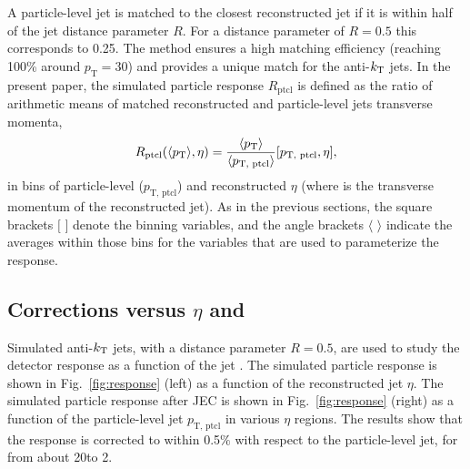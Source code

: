 \documentclass[11pt,twoside,a4paper,cmspaper,final,collab]{cms-tdr}
\begin{document}
A particle-level jet is matched to the closest reconstructed jet if it is within half of the jet distance parameter $R$. For a distance parameter of $R=0.5$ this corresponds to 0.25. The method ensures a high matching efficiency (reaching 100\% around $p_\mathrm{T}=30$\GeV) and provides a unique match for the anti-$k_{\mathrm{T}}$ jets.
In the present paper, the simulated particle response $R_\mathrm{ptcl}$ is defined as the ratio of arithmetic means of matched reconstructed and particle-level jets transverse momenta,
\begin{equation}
R_\mathrm{ptcl}(\langle p_{\mathrm{T}}\rangle,\eta) = \frac{\langle p_{\mathrm{T}}\rangle}{\langle p_\text{T, ptcl}\rangle}[p_\text{T, ptcl},\eta],
\end{equation}
in bins of particle-level \pt ($p_\text{T, ptcl}$) and reconstructed $\eta$ (where \pt is the transverse momentum of the reconstructed jet).
As in the previous sections, the square brackets $[$ $]$ denote the binning variables, and the angle brackets $\langle$ $\rangle$
indicate the averages within those bins for the variables that are used to parameterize the response.

\subsection{Corrections versus \texorpdfstring{$\eta$ and \pt}{eta and pT}}

Simulated anti-$k_{\mathrm{T}}$ jets, with a distance parameter $R=0.5$, are used to study the detector response as a function of the jet \pt. The simulated particle response is shown in Fig.~\ref{fig:response} (left) as a function of the reconstructed jet $\eta$. The simulated particle response after JEC is shown in Fig.~\ref{fig:response} (right) as a function of the particle-level jet $p_\text{T, ptcl}$
in various $\eta$ regions.
The results show that the response is corrected to within 0.5$\%$ with respect to the particle-level jet, for \pt from about 20\GeV to 2\TeV.
\end{document}
